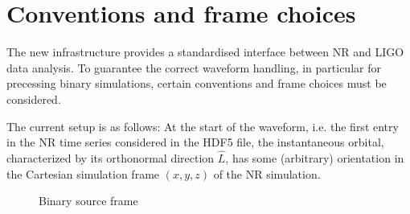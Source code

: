 \documentclass[aps,prd,amssymb,amsmath,amsfonts,superscriptaddress,
floatfix ,preprintnumbers,altaffilletter]{revtex4}
\begin{document}
\section{Conventions and frame choices}
\label{sec:conv}
The new infrastructure provides a standardised interface between NR and LIGO data analysis. To guarantee
the correct waveform handling, in particular for precessing binary simulations, certain conventions and frame
choices must be considered. 

The current setup is as follows: At the start of the waveform, i.e. the first entry in the NR time series considered in the
HDF5 file, the instantaneous orbital, characterized by its orthonormal direction $\hat{L}$, has some (arbitrary) orientation
in the Cartesian simulation frame $(x, y, z)$ of the NR simulation. 

\begin{figure}[!h]
\begin{center}
\def\svgwidth{0.4\columnwidth}

\caption{Binary source frame}
\label{fig:source}
\end{center}
\end{figure}




\end{document}
